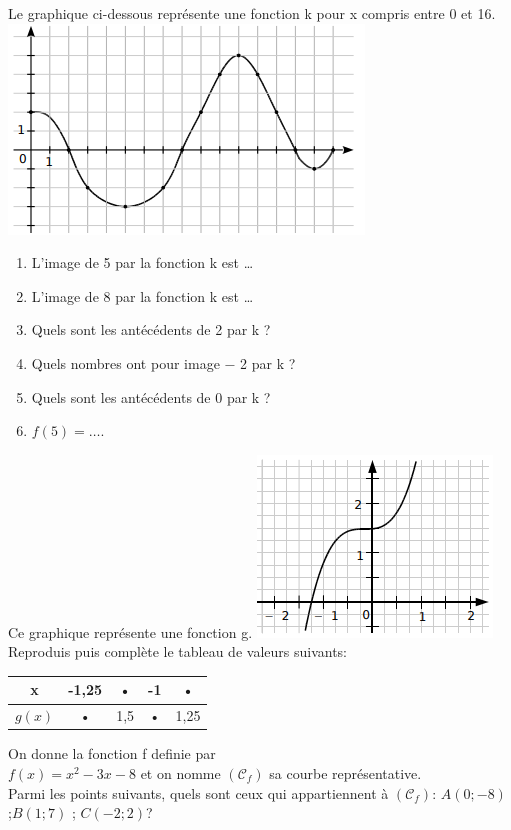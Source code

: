 \documentclass[nocrop]{sesamanuel}
\begin{document}
\begin{colonne*exercice}
\begin{exercice}
Le graphique ci-dessous représente une fonction k pour x compris entre 0 et 16.
\includegraphics[scale=0.7]{images/fonction_img1.png}\\
\begin{enumerate}
\item L'image de 5 par la fonction k est \ldots
\item L'image de 8 par la fonction k est \ldots
\item Quels sont les antécédents de 2 par k ?
\item Quels nombres ont pour image − 2 par k ?
\item Quels sont les antécédents de 0 par k ?
\item $f(5)=\ldots$.
\end{enumerate}
\end{exercice}

\begin{exercice}
Ce graphique représente une fonction g.
\includegraphics[scale=0.8]{images/fonction_img2.png} \\
Reproduis puis complète le tableau de valeurs suivants:\\
\begin{tabular}{|c|c|c|c|c|}
\hline 
x & -1,25 & • & -1 & • \\ 
\hline 
$g(x)$ & • & 1,5 & • & 1,25 \\ 
\hline 
\end{tabular} 
\end{exercice}

\begin{exercice}
On donne la fonction f definie par\\ $f(x)=x^2-3x-8$ et on nomme $(\mathcal{C}_f)$ sa courbe représentative.\\Parmi les points suivants, quels sont ceux qui appartiennent à $(\mathcal{C}_f)$: $A(0;-8)$ ;$B(1;7)$ ; $C(-2;2)$?
\end{exercice}

\end{colonne*exercice}
\end{document}
